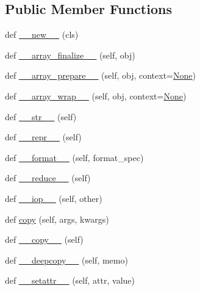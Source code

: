 \subsection*{Public Member Functions}
\begin{DoxyCompactItemize}
\item 
def \hyperlink{classnumpy_1_1ma_1_1core_1_1MaskedConstant_a02c04422dab20bf1dc987f373f26f4f3}{\+\_\+\+\_\+new\+\_\+\+\_\+} (cls)
\item 
def \hyperlink{classnumpy_1_1ma_1_1core_1_1MaskedConstant_ab8f8f5612e7517994ce94525e89bb51f}{\+\_\+\+\_\+array\+\_\+finalize\+\_\+\+\_\+} (self, obj)
\item 
def \hyperlink{classnumpy_1_1ma_1_1core_1_1MaskedConstant_a9bfa385c755d51073602f6e61f367dc5}{\+\_\+\+\_\+array\+\_\+prepare\+\_\+\+\_\+} (self, obj, context=\hyperlink{namespacenumpy_1_1ma_1_1core_a647ee1848dfa3692fe35a663a2aa40b3}{None})
\item 
def \hyperlink{classnumpy_1_1ma_1_1core_1_1MaskedConstant_a555f0259e21e04462b041309fc2d3923}{\+\_\+\+\_\+array\+\_\+wrap\+\_\+\+\_\+} (self, obj, context=\hyperlink{namespacenumpy_1_1ma_1_1core_a647ee1848dfa3692fe35a663a2aa40b3}{None})
\item 
def \hyperlink{classnumpy_1_1ma_1_1core_1_1MaskedConstant_af3690b762b7d272f2709d05cf3f559b5}{\+\_\+\+\_\+str\+\_\+\+\_\+} (self)
\item 
def \hyperlink{classnumpy_1_1ma_1_1core_1_1MaskedConstant_a788c70efa747f4ce4f6f323bcff2e0f3}{\+\_\+\+\_\+repr\+\_\+\+\_\+} (self)
\item 
def \hyperlink{classnumpy_1_1ma_1_1core_1_1MaskedConstant_ae286fc4101f99a368abb0fb842454eff}{\+\_\+\+\_\+format\+\_\+\+\_\+} (self, format\+\_\+spec)
\item 
def \hyperlink{classnumpy_1_1ma_1_1core_1_1MaskedConstant_ab91f54d57437844adbc75db088eb4e87}{\+\_\+\+\_\+reduce\+\_\+\+\_\+} (self)
\item 
def \hyperlink{classnumpy_1_1ma_1_1core_1_1MaskedConstant_ad76fc4d31a80247f1dbc0bf68d8663e4}{\+\_\+\+\_\+iop\+\_\+\+\_\+} (self, other)
\item 
def \hyperlink{classnumpy_1_1ma_1_1core_1_1MaskedConstant_ac126d3aa5bd755e307923233c9780b94}{copy} (self, args, kwargs)
\item 
def \hyperlink{classnumpy_1_1ma_1_1core_1_1MaskedConstant_af99219d1f288a7196621a4486a7b0528}{\+\_\+\+\_\+copy\+\_\+\+\_\+} (self)
\item 
def \hyperlink{classnumpy_1_1ma_1_1core_1_1MaskedConstant_ab8122ef9035f905087e7a12fa2f89db1}{\+\_\+\+\_\+deepcopy\+\_\+\+\_\+} (self, memo)
\item 
def \hyperlink{classnumpy_1_1ma_1_1core_1_1MaskedConstant_a06a298ebbde8289db316a2300487d6ea}{\+\_\+\+\_\+setattr\+\_\+\+\_\+} (self, attr, value)
\end{DoxyCompactItemize}
